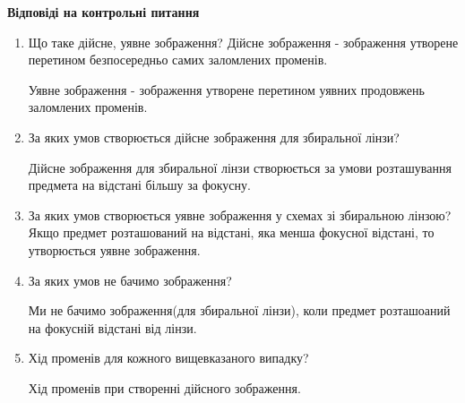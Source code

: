 \begin{center}
    \Large{\textbf{Відповіді на контрольні питання}}    
\end{center}

\vspace{1mm}

\begin{enumerate}
    \item Що таке дійсне, уявне зображення?  
    \bigbreak
    Дійсне зображення - зображення утворене перетином безпосередньо самих
    заломлених променів.

    Уявне зображення - зображення утворене перетином уявних продовжень
    заломлених променів.

    \item За яких умов створюється дійсне зображення для збиральної лінзи?
    \bigbreak
    
    Дійсне зображення для збиральної лінзи створюється за умови
    розташування предмета на відстані більшу за фокусну.

    \item За яких умов створюється уявне зображення у схемах зі збиральною лінзою?
    \bigbreak
    Якщо предмет розташований на відстані, яка менша фокусної відстані, то
    утворюється уявне зображення.

    \item За яких умов не бачимо зображення?
    \bigbreak

    Ми не бачимо зображення(для збиральної лінзи), коли
    предмет розташоаний на фокусній відстані від лінзи.

    \item Хід променів для кожного вищевказаного випадку?
    \bigbreak

    Хід променів при створенні дійсного зображення.


\end{enumerate}
